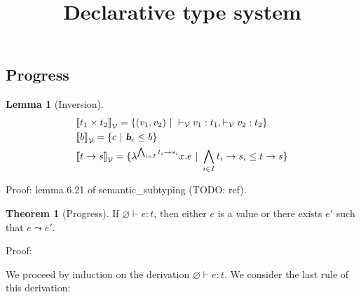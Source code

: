 \documentclass[a4paper]{article}
\title{\vspace{1.5cm}Declarative type system}
\author{}
\date{\vspace{-5ex}}
\theoremstyle{definition}
\newtheorem{theorem}{Theorem}
\newtheorem{lemma}{Lemma}
\begin{document}
  \maketitle

  \subsection{Progress}

      \begin{lemma}[Inversion]
        \begin{align*}
          &\valsemantic{\pair {t_1} {t_2}} = \{(v_1,v_2) \alt \vvdash v_1:t_1, \vvdash v_2:t_2 \}\\
          &\valsemantic{b} = \{c \alt \basic{c} \leq b \}\\
          &\valsemantic{\arrow t s} = \{\lambda^{\bigwedge_{i\in I}\arrow {t_i} {s_i}}x.e \alt \bigwedge_{i\in I}\arrow {t_i} {s_i} \leq \arrow t s\}
        \end{align*}
      \end{lemma}
      Proof: lemma 6.21 of semantic\_subtyping (TODO: ref).

      \begin{theorem}[Progress]
      If $\varnothing \vdash e:t$, then either $e$ is a value or there exists $e'$ such that $e \leadsto e'$.
      \end{theorem}

      Proof:

      We proceed by induction on the derivation $\varnothing \vdash e:t$.
      We consider the last rule of this derivation:
\end{document}
